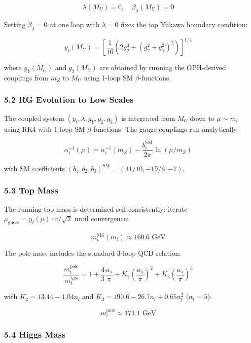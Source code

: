 \[\lambda(M_U) = 0, \quad \beta_\lambda(M_U) = 0\]

Setting \(\beta_\lambda = 0\) at one loop with \(\lambda = 0\) fixes the top Yukawa boundary condition:

\[y_t(M_U) = \left[\frac{1}{16}\left(2g_2^4 + (g_2^2 + g_Y^2)^2\right)\right]^{1/4}\]

where \(g_Y(M_U)\) and \(g_2(M_U)\) are obtained by running the OPH-derived couplings from \(m_Z\) to \(M_U\) using 1-loop SM \(\beta\)-functions.

\subsubsection{5.2 RG Evolution to Low Scales}\label{52-rg-evolution-to-low-scales}

The coupled system \((y_t, \lambda, g_Y, g_2, g_3)\) is integrated from \(M_U\) down to \(\mu \sim m_t\) using RK4 with 1-loop SM \(\beta\)-functions. The gauge couplings run analytically:

\[\alpha_i^{-1}(\mu) = \alpha_i^{-1}(m_Z) - \frac{b_i^{\text{SM}}}{2\pi}\ln(\mu/m_Z)\]

with SM coefficients \((b_1, b_2, b_3)^{\text{SM}} = (41/10, -19/6, -7)\).

\subsubsection{5.3 Top Mass}\label{53-top-mass}

The running top mass is determined self-consistently: iterate \(\mu_{\text{guess}} = y_t(\mu) \cdot v/\sqrt{2}\) until convergence:

\[m_t^{\overline{\text{MS}}}(m_t) \approx 160.6 \text{ GeV}\]

The pole mass includes the standard 3-loop QCD relation:

\[\frac{m_t^{\text{pole}}}{m_t^{\overline{\text{MS}}}} = 1 + \frac{4}{3}\frac{\alpha_s}{\pi} + K_2 \left(\frac{\alpha_s}{\pi}\right)^2 + K_3 \left(\frac{\alpha_s}{\pi}\right)^3\]

with \(K_2 = 13.44 - 1.04 n_l\) and \(K_3 = 190.6 - 26.7 n_l + 0.65 n_l^2\) (\(n_l = 5\)).

\[m_t^{\text{pole}} \approx 171.1 \text{ GeV}\]

\subsubsection{5.4 Higgs Mass}\label{54-higgs-mass}

